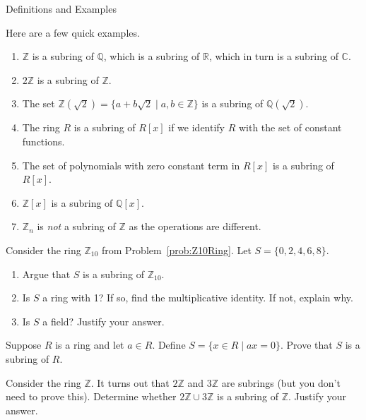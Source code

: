 \begin{section}{Definitions and Examples}
\begin{example}
Here are a few quick examples.
\begin{enumerate}[label=\textrm{(\alph*)}]
\item $\mathbb{Z}$ is a subring of $\mathbb{Q}$, which is a subring of $\mathbb{R}$, which in turn is a subring of $\mathbb{C}$.
\item $2\mathbb{Z}$ is a subring of $\mathbb{Z}$.
\item The set $\mathbb{Z}(\sqrt{2})=\{a+b\sqrt{2}\mid a,b\in\mathbb{Z}\}$ is a subring of $\mathbb{Q}(\sqrt{2})$.
\item The ring $R$ is a subring of $R[x]$ if we identify $R$ with the set of constant functions.
\item The set of polynomials with zero constant term in $R[x]$ is a subring of $R[x]$.
\item $\mathbb{Z}[x]$ is a subring of $\mathbb{Q}[x]$.
\item $\mathbb{Z}_n$ is \emph{not} a subring of $\mathbb{Z}$ as the operations are different.
\end{enumerate} 
\end{example}

\begin{problem}
Consider the ring $\mathbb{Z}_{10}$ from Problem~\ref{prob:Z10Ring}. Let $S=\{0,2,4,6,8\}$.
\begin{enumerate}[label=\textrm{(\alph*)}]
\item Argue that $S$ is a subring of $\mathbb{Z}_{10}$.
\item Is $S$ a ring with 1?  If so, find the multiplicative identity.  If not, explain why.
\item Is $S$ a field? Justify your answer.
\end{enumerate}
\end{problem}

\begin{problem}
Suppose $R$ is a ring and let $a\in R$.  Define $S=\{x\in R\mid ax=0\}$.  Prove that $S$ is a subring of $R$.
\end{problem}

\begin{problem}
Consider the ring $\mathbb{Z}$.  It turns out that $2\mathbb{Z}$ and $3\mathbb{Z}$ are subrings (but you don't need to prove this).  Determine whether $2\mathbb{Z}\cup 3\mathbb{Z}$ is a subring of $\mathbb{Z}$.  Justify your answer.
\end{problem}

\end{section}


